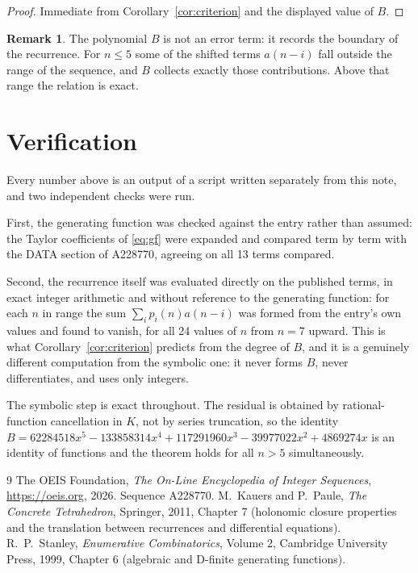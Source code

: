 \documentclass[11pt,a4paper]{article}
\theoremstyle{plain}
\theoremstyle{definition}
\newtheorem{remark}[theorem]{Remark}
\begin{document}
\begin{proof}
Immediate from Corollary~\ref{cor:criterion} and the displayed value of $B$.
\end{proof}

\begin{remark}
The polynomial $B$ is not an error term: it records the boundary of the recurrence. For
$n\le5$ some of the shifted terms $a(n-i)$ fall outside the range of the sequence,
and $B$ collects exactly those contributions. Above that range the relation is exact.
\end{remark}

\section{Verification}

Every number above is an output of a script written separately from this note, and two
independent checks were run.

First, the generating function was checked against the entry rather than assumed: the
Taylor coefficients of \eqref{eq:gf} were expanded and compared term by term with the DATA
section of A228770, agreeing on all 13 terms compared.

Second, the recurrence itself was evaluated directly on the published terms, in exact
integer arithmetic and without reference to the generating function: for each $n$ in range
the sum $\sum_{i}p_{i}(n)a(n-i)$ was formed from the entry's own values and found to
vanish, for all 24 values of $n$ from $n=7$ upward. This is what
Corollary~\ref{cor:criterion} predicts from the degree of $B$, and it is a genuinely
different computation from the symbolic one: it never forms $B$, never differentiates, and
uses only integers.

The symbolic step is exact throughout. The residual is obtained by rational-function
cancellation in $K$, not by series truncation, so the identity $B=62284518 x^{5} - 133858314 x^{4} + 117291960 x^{3} - 39977022 x^{2} + 4869274 x$ is an
identity of functions and the theorem holds for all $n>5$ simultaneously.

\begin{thebibliography}{9}
 The OEIS Foundation, \emph{The On-Line Encyclopedia of Integer Sequences},
\url{https://oeis.org}, 2026. Sequence A228770.
 M.~Kauers and P.~Paule, \emph{The Concrete Tetrahedron}, Springer, 2011,
Chapter 7 (holonomic closure properties and the translation between recurrences and
differential equations).
 R.~P.~Stanley, \emph{Enumerative Combinatorics}, Volume 2, Cambridge
University Press, 1999, Chapter 6 (algebraic and D-finite generating functions).
\end{thebibliography}
\end{document}
